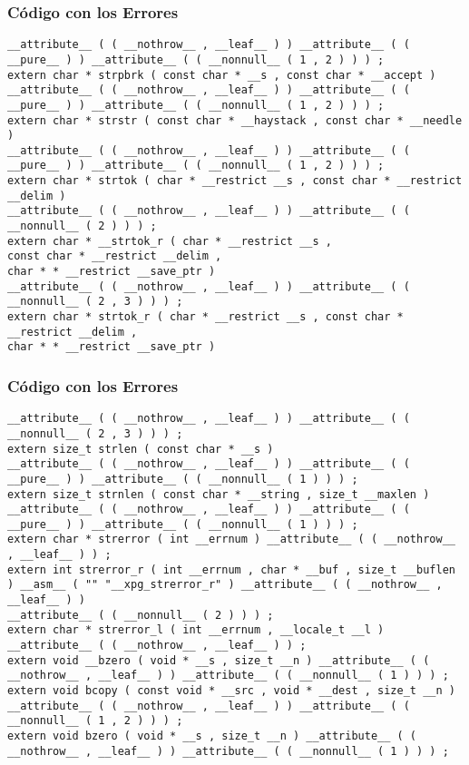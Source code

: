 \documentclass{beamer}
\begin{document}
\begin{frame}[fragile]
\frametitle{C\'odigo con los Errores}
\begin{lstlisting}[style=CStyle]
__attribute__ ( ( __nothrow__ , __leaf__ ) ) __attribute__ ( ( __pure__ ) ) __attribute__ ( ( __nonnull__ ( 1 , 2 ) ) ) ; 
extern char * strpbrk ( const char * __s , const char * __accept ) 
__attribute__ ( ( __nothrow__ , __leaf__ ) ) __attribute__ ( ( __pure__ ) ) __attribute__ ( ( __nonnull__ ( 1 , 2 ) ) ) ; 
extern char * strstr ( const char * __haystack , const char * __needle ) 
__attribute__ ( ( __nothrow__ , __leaf__ ) ) __attribute__ ( ( __pure__ ) ) __attribute__ ( ( __nonnull__ ( 1 , 2 ) ) ) ; 
extern char * strtok ( char * __restrict __s , const char * __restrict __delim ) 
__attribute__ ( ( __nothrow__ , __leaf__ ) ) __attribute__ ( ( __nonnull__ ( 2 ) ) ) ; 
extern char * __strtok_r ( char * __restrict __s , 
const char * __restrict __delim , 
char * * __restrict __save_ptr ) 
__attribute__ ( ( __nothrow__ , __leaf__ ) ) __attribute__ ( ( __nonnull__ ( 2 , 3 ) ) ) ; 
extern char * strtok_r ( char * __restrict __s , const char * __restrict __delim , 
char * * __restrict __save_ptr ) 
\end{lstlisting}
\end{frame}
\begin{frame}[fragile]
\frametitle{C\'odigo con los Errores}
\begin{lstlisting}[style=CStyle]
__attribute__ ( ( __nothrow__ , __leaf__ ) ) __attribute__ ( ( __nonnull__ ( 2 , 3 ) ) ) ; 
extern size_t strlen ( const char * __s ) 
__attribute__ ( ( __nothrow__ , __leaf__ ) ) __attribute__ ( ( __pure__ ) ) __attribute__ ( ( __nonnull__ ( 1 ) ) ) ; 
extern size_t strnlen ( const char * __string , size_t __maxlen ) 
__attribute__ ( ( __nothrow__ , __leaf__ ) ) __attribute__ ( ( __pure__ ) ) __attribute__ ( ( __nonnull__ ( 1 ) ) ) ; 
extern char * strerror ( int __errnum ) __attribute__ ( ( __nothrow__ , __leaf__ ) ) ; 
extern int strerror_r ( int __errnum , char * __buf , size_t __buflen ) __asm__ ( "" "__xpg_strerror_r" ) __attribute__ ( ( __nothrow__ , __leaf__ ) ) 
__attribute__ ( ( __nonnull__ ( 2 ) ) ) ; 
extern char * strerror_l ( int __errnum , __locale_t __l ) __attribute__ ( ( __nothrow__ , __leaf__ ) ) ; 
extern void __bzero ( void * __s , size_t __n ) __attribute__ ( ( __nothrow__ , __leaf__ ) ) __attribute__ ( ( __nonnull__ ( 1 ) ) ) ; 
extern void bcopy ( const void * __src , void * __dest , size_t __n ) 
__attribute__ ( ( __nothrow__ , __leaf__ ) ) __attribute__ ( ( __nonnull__ ( 1 , 2 ) ) ) ; 
extern void bzero ( void * __s , size_t __n ) __attribute__ ( ( __nothrow__ , __leaf__ ) ) __attribute__ ( ( __nonnull__ ( 1 ) ) ) ; 
\end{lstlisting}
\end{frame}
\end{document}
